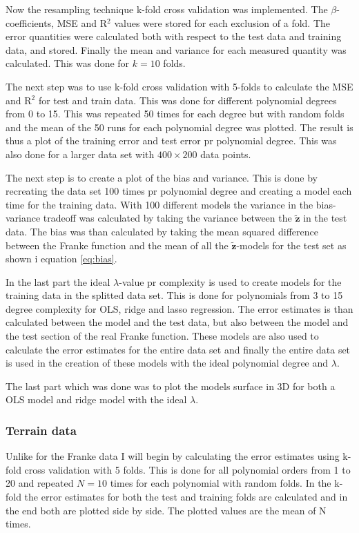 \documentclass[uio,jmp,amsmath,amssymb,reprint,nofootinbib]{revtex4-1}
\numberwithin{equation}{section}
\begin{document}
Now the resampling technique k-fold cross validation was implemented. The \(\beta\)-coefficients, MSE and R\(^2\) values were stored for each exclusion of a fold. The error quantities were calculated both with respect to the test data and training data, and stored. Finally the mean and variance for each measured quantity was calculated. This was done for \(k=10\) folds.

The next step was to use k-fold cross validation with 5-folds to calculate the MSE and R\(^2\) for test and train data. This was done for different polynomial degrees from 0 to 15. This was repeated 50 times for each degree but with random folds and the mean of the 50 runs for each polynomial degree was plotted. The result is thus a plot of the training error and test error pr polynomial degree. This was also done for a larger data set with \(400\times 200\) data points.

The next step is to create a plot of the bias and variance. This is done by recreating the data set 100 times pr polynomial degree and creating a model each time for the training data. With 100 different models the variance in the bias-variance tradeoff was calculated by taking the variance between the \(\bm{\tilde{z}}\) in the test data. The bias was than calculated by taking the mean squared difference between the Franke function and the mean of all the \(\bm{\tilde{z}}\)-models for the test set as shown i equation \ref{eq:bias}.

In the last part the ideal \(\lambda\)-value pr complexity is used to create models for the training data in the splitted data set. This is done for polynomials from 3 to 15 degree complexity for OLS, ridge and lasso regression. The error estimates is than calculated between the model and the test data, but also between the model and the test section of the real Franke function. These models are also used to calculate the error estimates for the entire data set and finally the entire data set is used in the creation of these models with the ideal polynomial degree and \(\lambda\).

The last part which was done was to plot the models surface in 3D for both a OLS model and ridge model with the ideal \(\lambda\).

\subsubsection{Terrain data}

Unlike for the Franke data I will begin by calculating the error estimates using k-fold cross validation with 5 folds. This is done for all polynomial orders from 1 to 20 and repeated \(N=10\) times for each polynomial with random folds. In the k-fold the error estimates for both the test and training folds are calculated and in the end both are plotted side by side. The plotted values are the mean of N times.
\end{document}

